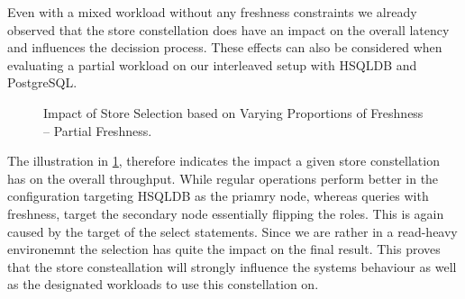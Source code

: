Even with a mixed workload without any freshness constraints we already observed that the store constellation does have an impact on the overall latency 
and influences the decission process. 
These effects can also be considered when evaluating a partial workload on our interleaved setup with HSQLDB and PostgreSQL.


\begin{figure}[t] 
    \centering 
    \caption{Impact of Store Selection based on Varying Proportions of Freshness -- Partial Freshness.}
    \label{fig:mixed}
\end{figure}

The illustration in \ref{fig:mixed}, therefore indicates the impact a given store constellation has on the overall throughput.
While regular operations perform better in the configuration targeting HSQLDB as the priamry node,
whereas queries with freshness, target the secondary node essentially flipping the roles.
This is again caused by the target of the select statements. 
Since we are rather in a read-heavy environemnt the selection has quite the impact on the final result.
This proves that the store consteallation will strongly influence the systems behaviour as well as the designated workloads to use this constellation on.


